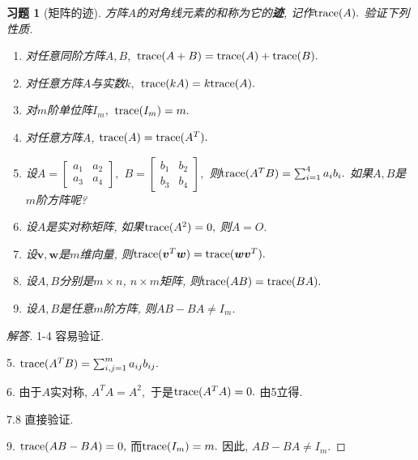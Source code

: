 \documentclass[UTF8]{ctexart}
\newcommand\bs[1]{\boldsymbol{ #1}}
\newtheorem{ex}[thm]{习题}
\begin{document}
\begin{ex}[矩阵的迹]\label{trace}
方阵$A$的对角线元素的和称为它的{\bf 迹}, 记作${\rm trace}(A).$ 验证下列性质.
\begin{enumerate}
\item 对任意同阶方阵$A,B,$ ${\rm trace}(A + B) = {\rm trace}(A) + {\rm trace}(B).$

\item 对任意方阵$A$与实数$k,$ ${\rm trace}(kA ) = k{\rm trace}(A) .$

\item 对$m$阶单位阵$I_m,$ ${\rm trace}(I_m ) = m .$

\item 对任意方阵$A$, ${\rm trace}(A ) = {\rm trace}(A^T) .$

\item 设$A = \begin{bmatrix} a_1 & a_2 \\ a_3 & a_4  \end{bmatrix},$ $B = \begin{bmatrix} b_1 & b_2\\ b_3 & b_4  \end{bmatrix},$ 则${\rm trace}(A^T B) = \sum_{i=1}^4 a_i b_i.$ 如果$A,B$是$m$阶方阵呢?

\item 设$A$是实对称矩阵, 如果${\rm trace}(A^2) = 0,$ 则$A = O.$

\item 设$\bs v,\bs w$是$m$维向量, 则${\rm trace}(\bs v^T \bs w ) = {\rm trace}(\bs w \bs v^T) .$

\item 设$A,B$分别是$m\times n$, $n\times m$矩阵, 则${\rm trace}(AB ) = {\rm trace}(BA) .$

\item 设$A,B$是任意$m$阶方阵, 则$AB - BA \neq I_m.$
\end{enumerate}
\end{ex}
\begin{proof}[解答]
1-4 容易验证.

5. ${\rm trace}(A^T B) = \sum_{i,j=1}^m a_{ij} b_{ij}.$

6. 由于$A$实对称, $A^T A = A^2,$ 于是${\rm trace}(A^T A) = 0.$ 由5立得.

7.8 直接验证.

9. ${\rm trace}(AB- BA) = 0,$ 而${\rm trace}(I_m) = m.$ 因此, $AB - BA \neq I_m.$
\end{proof}
\end{document}
